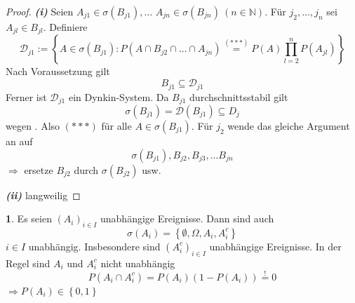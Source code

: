\documentclass[10pt,a4paper]{report}
\numberwithin{equation}{section}
\numberwithin{figure}{section}
\theoremstyle{plain}
\theoremstyle{definition}
\newtheorem{example}[thm]{\protect\examplename}
\theoremstyle{remark}
\theoremstyle{plain}
\providecommand{\examplename}{Beispiel}
\newcommand{\1}{ \mathbb{1} } %
\begin{document}
\begin{proof}
  \textbf{\emph{(i)}} Seien $A_{j1}\in\sigma\left(B_{j1}\right),\ldots$
  $A_{jn}\in\sigma\left(B_{jn}\right)\ \left(n\in\mathbb{N}\right)$.
  Für $j_{2},\ldots,j_{n}$ sei $A_{jl}\in B_{jl}$. Definiere
  \begin{equation}
    \mathcal{D}_{j1}:=\left\{ A\in\sigma\left(B_{j1}\right):P\left(A\cap B_{j2}\cap\ldots\cap A_{jn}\right)\overset{(***)}{=}P\left(A\right)\prod_{l=2}^{n}P\left(A_{jl}\right)\right\} \label{eq:b1.2**-1}
  \end{equation}
  Nach Voraussetzung gilt
  \begin{equation}
    B_{j1}\subseteq\mathcal{D}_{j1}\label{eq:b1.2**}
  \end{equation}
  Ferner ist $\mathcal{D}_{j1}$ ein Dynkin-System. Da $B_{j1}$ durchschnittsstabil
  gilt
  \[
  \sigma\left(B_{j1}\right)=\mathcal{D}\left(B_{j1}\right)\subseteq D_{j}
  \]
  wegen . Also $(***)$ für alle $A\in\sigma\left(B_{j1}\right)$.
  Für $j_{2}$ wende das gleiche Argument an auf
  \[
  \sigma\left(B_{j1}\right),B_{j2},B_{j3},\ldots B_{jn}
  \]
  $\Rightarrow$ ersetze $B_{j2}$ durch $\sigma\left(B_{j2}\right)$
  usw.

  \textbf{\emph{(ii)}} langweilig
\end{proof}
\begin{example}
  Es seien $\left(A_{i}\right)_{i\in I}$ unabhängige Ereignisse. Dann
  sind auch 
  \[
  \sigma\left(A_{i}\right)=\left\{ \emptyset,\Omega,A_{i},A_{i}^{c}\right\} 
  \]
  $i\in I$ unabhängig. Insbesondere sind $\left(A_{i}^{c}\right)_{i\in I}$
  unabhängige Ereignisse. In der Regel sind $A_{i}$ und $A_{i}^{c}$
  nicht unabhängig
  \[
  P\left(A_{i}\cap A_{i}^{c}\right)=P\left(A_{i}\right)\left(1-P\left(A_{i}\right)\right)\overset{!}{=}0
  \]
  $\Rightarrow P\left(A_{i}\right)\in\left\{ 0,1\right\} $
\end{example}
\end{document}
